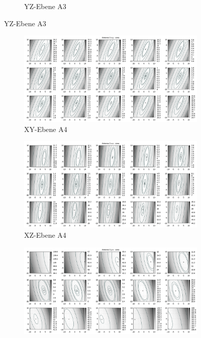 \begin{appendix}
\begin{landscape}
\begin{figure}[!ht]
\begin{subfigure}[t]{0.5\textwidth}
				\caption{YZ-Ebene A3}
	\end{subfigure}
\end{figure}
\newpage
%
\begin{figure}[!ht]
	\centering
	\begin{subfigure}[t]{0.5\textwidth}
	     \centering
	     \includegraphics[width=\textwidth]{img/fitness/xy/a3.png}
	             \caption{XY-Ebene A4}
	\end{subfigure}
	\begin{subfigure}[t]{0.5\textwidth}
		\centering
	     \includegraphics[width=\textwidth]{img/fitness/xz/a3.png}
				\caption{XZ-Ebene A4}
	\end{subfigure}
	\begin{subfigure}[t]{0.5\textwidth}
			\centering
	   \includegraphics[width=\textwidth]{img/fitness/yz/a3.png}

\end{subfigure}
\end{figure}
\end{landscape}
\end{appendix}
